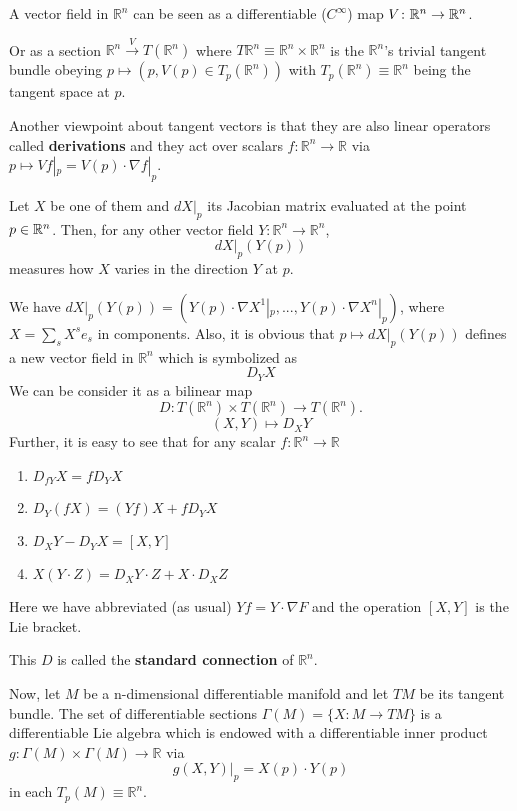 \documentclass[12pt]{article}
\begin{document}
A vector field in ${\mathbb{R}}^n$ can be seen as a differentiable ($C^{\infty}$) map 
$V\colon{\Bbb{R}}^n\to {\mathbb{R}}^n$. 

Or as a section ${\mathbb{R}}^n\stackrel{V}\to T({\mathbb{R}}^n)$
where $T{\mathbb{R}}^n\equiv{\mathbb{R}}^n\times{\mathbb{R}}^n$ is the ${\mathbb{R}}^n$'s trivial tangent bundle obeying
$p\mapsto (p,V(p)\in T_p({\mathbb{R}}^n))$ with $T_p({\mathbb{R}}^n)\equiv{\mathbb{R}}^n$ being the tangent space at $p$. 

Another viewpoint about tangent vectors is that they are also linear operators called {\bf derivations} and they act 
over scalars $f\colon {\mathbb{R}}^n\to{\mathbb{R}}$ via $p\mapsto Vf|_p=V(p)\cdot\nabla f|_p$.

Let $X$ be one of them and $dX|_p$ its Jacobian matrix evaluated at the point $p\in{\Bbb{R}}^n$.
Then, for any other vector field $Y\colon{\mathbb{R}}^n\to{\mathbb{R}}^n$, 
$$dX|_p(Y(p))$$
 measures how $X$ varies in the direction $Y$ at $p$. 

We have $dX|_p(Y(p))=(Y(p)\cdot\nabla X^1|_p,...,Y(p)\cdot\nabla X^n|_p)$, where $X=\sum_sX^se_s$ in components. 
Also, it is obvious that $p\mapsto dX|_p(Y(p))$ defines a new vector field in ${\mathbb{R}}^n$ which is symbolized as
$$D_YX$$
We can be consider it as a bilinear map
$$D:T({\mathbb{R}}^n)\times T({\mathbb{R}}^n)\to T({\mathbb{R}}^n).$$
$$(X,Y)\mapsto D_XY$$
Further, it is easy to see that for any scalar $f\colon {\mathbb{R}}^n\to{\mathbb{R}}$ 
\begin{enumerate}
\item $D_{fY}X=fD_YX$
\item $D_Y(fX)=(Yf)X+ fD_YX$
\item $D_XY-D_YX=[X,Y]$
\item $X(Y\cdot Z)=D_XY\cdot Z+X\cdot D_XZ$

\end{enumerate} 
Here we have abbreviated (as usual) $Yf=Y\cdot\nabla F$ and the operation $[X,Y]$ is the Lie bracket.

This $D$ is called the {\bf standard connection} of ${\mathbb{R}}^n$.

Now, let $M$ be a n-dimensional differentiable manifold and let $TM$ be its tangent bundle.
The set of differentiable sections $\Gamma(M)=\{X\colon M\to TM\}$ is a differentiable Lie algebra which is endowed with a differentiable inner product $g\colon\Gamma(M)\times\Gamma(M)\to{\mathbb{R}}$ via
$$g(X,Y)|_p=X(p)\cdot Y(p)$$ 
in each $T_p(M)\equiv{\mathbb{R}}^n$.
\end{document}
